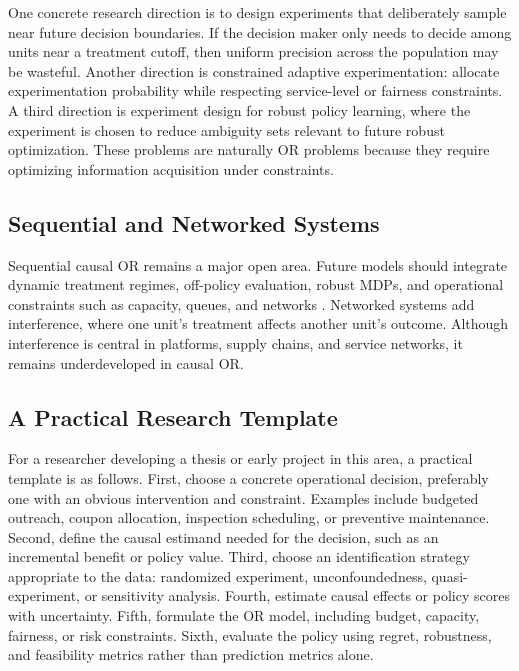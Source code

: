 \documentclass[11pt]{article}
\begin{document}
One concrete research direction is to design experiments that deliberately sample near future decision boundaries. If the decision maker only needs to decide among units near a treatment cutoff, then uniform precision across the population may be wasteful. Another direction is constrained adaptive experimentation: allocate experimentation probability while respecting service-level or fairness constraints. A third direction is experiment design for robust policy learning, where the experiment is chosen to reduce ambiguity sets relevant to future robust optimization. These problems are naturally OR problems because they require optimizing information acquisition under constraints.

\subsection{Sequential and Networked Systems}

Sequential causal OR remains a major open area. Future models should integrate dynamic treatment regimes, off-policy evaluation, robust MDPs, and operational constraints such as capacity, queues, and networks \citep{murphy2003dynamic,iyengar2005robust,wiesemann2013robust}. Networked systems add interference, where one unit's treatment affects another unit's outcome. Although interference is central in platforms, supply chains, and service networks, it remains underdeveloped in causal OR.

\subsection{A Practical Research Template}

For a researcher developing a thesis or early project in this area, a practical template is as follows. First, choose a concrete operational decision, preferably one with an obvious intervention and constraint. Examples include budgeted outreach, coupon allocation, inspection scheduling, or preventive maintenance. Second, define the causal estimand needed for the decision, such as an incremental benefit or policy value. Third, choose an identification strategy appropriate to the data: randomized experiment, unconfoundedness, quasi-experiment, or sensitivity analysis. Fourth, estimate causal effects or policy scores with uncertainty. Fifth, formulate the OR model, including budget, capacity, fairness, or risk constraints. Sixth, evaluate the policy using regret, robustness, and feasibility metrics rather than prediction metrics alone.
\end{document}
